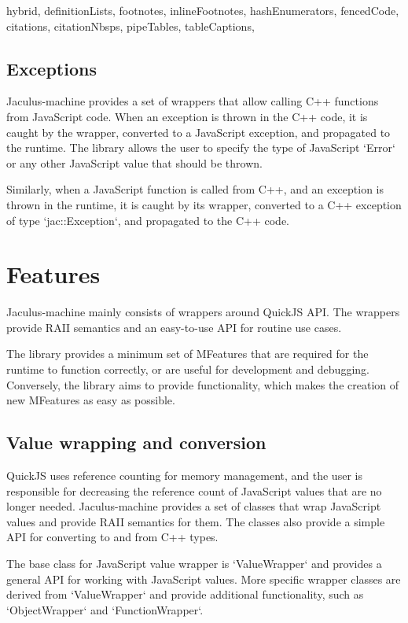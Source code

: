 \begin{markdown*}{%
  hybrid,
  definitionLists,
  footnotes,
  inlineFootnotes,
  hashEnumerators,
  fencedCode,
  citations,
  citationNbsps,
  pipeTables,
  tableCaptions,
}
\subsection{Exceptions}

Jaculus-machine provides a set of wrappers that allow calling C++ functions from JavaScript code. When an exception is thrown in the C++ code, it is caught by the wrapper, converted to a JavaScript exception, and propagated to the runtime. The library allows the user to specify the type of JavaScript `Error` or any other JavaScript value that should be thrown.

Similarly, when a JavaScript function is called from C++, and an exception is thrown in the runtime, it is caught by its wrapper, converted to a C++ exception of type `jac::Exception`, and propagated to the C++ code.


\section{Features}

Jaculus-machine mainly consists of wrappers around QuickJS API. The wrappers provide RAII semantics and an easy-to-use API for routine use cases.

The library provides a minimum set of MFeatures that are required for the runtime to function correctly, or are useful for development and debugging. Conversely, the library aims to provide functionality, which makes the creation of new MFeatures as easy as possible.


\subsection{Value wrapping and conversion}

QuickJS uses reference counting for memory management, and the user is responsible for decreasing the reference count of JavaScript values that are no longer needed. Jaculus-machine provides a set of classes that wrap JavaScript values and provide RAII semantics for them. The classes also provide a simple API for converting to and from C++ types.

The base class for JavaScript value wrapper is `ValueWrapper` and provides a general API for working with JavaScript values. More specific wrapper classes are derived from `ValueWrapper` and provide additional functionality, such as `ObjectWrapper` and `FunctionWrapper`.


\end{markdown*}
